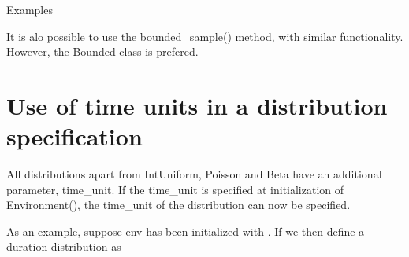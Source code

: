 \documentclass[letterpaper,10pt,english]{sphinxmanual}
\begin{document}
Examples

%
\begin{sphinxVerbatim}[commandchars=\\\{\}]
    
    
   
   
\end{sphinxVerbatim}

It is alo possible to use the bounded\_sample() method, with similar functionality. However, the Bounded
class is prefered.


\section{Use of time units in a distribution specification}
\label{\detokenize{Distributions:use-of-time-units-in-a-distribution-specification}}
All distributions apart from IntUniform, Poisson and Beta have an additional parameter, time\_unit.
If the time\_unit is specified at initialization of Environment(), the time\_unit of the distribution
can now be specified.

As an example, suppose env has been initialized with .
If we then define a duration distribution as

%
\begin{sphinxVerbatim}[commandchars=\\\{\}]
    
\end{sphinxVerbatim}
\end{document}
